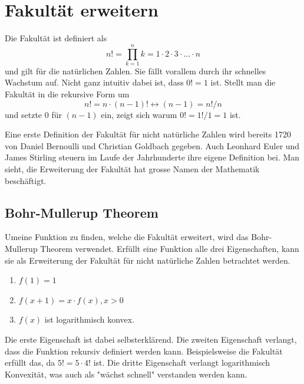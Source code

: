 %
%
%
%
\section{Fakultät erweitern\label{gamma:section:teil0}}

Die Fakultät ist definiert als
\begin{equation}
n! = \prod_{k=1}^{n} k = 1 \cdot 2 \cdot 3 \cdot \ldots \cdot n
\label{gamma:fakultaet}
\end{equation}
und gilt für die natürlichen Zahlen. Sie fällt vorallem durch ihr schnelles Wachstum auf.
Nicht ganz intuitiv dabei ist, dass $0! = 1$ ist. Stellt man die Fakultät in die rekursive Form um
\begin{equation}
n! = n \cdot (n-1)! \leftrightarrow (n-1) = n!/n
\label{gamma:fakultaet-rekursiv}
\end{equation}
und setzte 0 für $(n-1)$ ein, zeigt sich warum $0! = 1!/1 = 1$ ist. 

Eine erste Definition der Fakultät für nicht natürliche Zahlen wird bereits 1720 von Daniel Bernoulli und Christian Goldbach gegeben. 
Auch Leonhard Euler und James Stirling steuern im Laufe der Jahrhunderte ihre eigene Definition bei. 
Man sieht, die Erweiterung der Fakultät hat grosse Namen der Mathematik beschäftigt. 

\subsection{Bohr-Mullerup Theorem}

Umeine Funktion zu finden, welche die Fakultät erweitert, wird das Bohr-Mullerup Theorem verwendet. 
Erfüllt eine Funktion alle drei Eigenschaften, kann sie als Erweiterung der Fakultät für nicht natürliche Zahlen betrachtet werden.
\begin{enumerate}
  \item $f(1) = 1$
  \item $f(x+1) = x \cdot f(x), x > 0$
  \item $f(x)$ ist logarithmisch konvex.
\end{enumerate}

Die erste Eigenschaft ist dabei selbsterklärend.
Die zweiten Eigenschaft verlangt, dass die Funktion rekursiv definiert werden kann. 
Beispielsweise die Fakultät erfüllt das, da $5! = 5 \cdot 4!$ ist.
Die dritte Eigenschaft verlangt logarithmisch Konvexität, was auch als "wächst schnell" verstanden werden kann.

